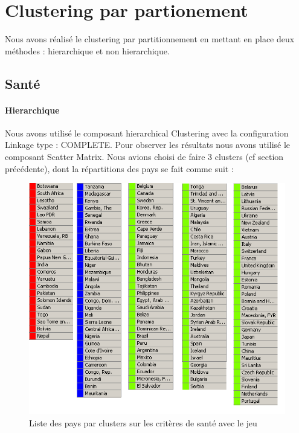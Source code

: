 \section{Clustering par partionement}
Nous avons réalisé le clustering par partitionnement en mettant en place deux méthodes : hierarchique et non hierarchique. 

\subsection{Santé}

\paragraph{Hierarchique}
Nous avons utilisé le composant hierarchical Clustering avec la configuration Linkage type : COMPLETE. Pour observer les résultats nous avons utilisé le composant Scatter Matrix.
Nous avions choisi de faire 3 clusters (cf section précédente), dont la répartitions des pays se fait comme suit : 

\begin{figure}[H]
	\begin{center}
		\includegraphics[scale=0.5]{Image/TableViewSanteNoMissing2}
		\caption{Liste des pays par clusters sur les critères de santé avec le jeu \jeuc}
	\end{center}
\end{figure}


